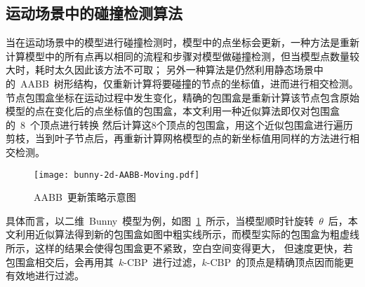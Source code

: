 \subsection{运动场景中的碰撞检测算法}
\label{subsec:moving:cd}

当在运动场景中的模型进行碰撞检测时，模型中的点坐标会更新，一种方法是重新计算模型中的所有点再以相同的流程和步骤对模型做碰撞检测，但当模型点数量较大时，耗时太久因此该方法不可取；
另外一种算法是仍然利用静态场景中的~AABB~树形结构，仅重新计算将要碰撞的节点的坐标值，进而进行相交检测。
节点包围盒坐标在运动过程中发生变化，精确的包围盒是重新计算该节点包含原始模型的点在变化后的点坐标值的包围盒，本文利用一种近似算法即仅对包围盒的~8~个顶点进行转换
然后计算这8个顶点的包围盒，用这个近似包围盒进行遍历剪枝，当到叶子节点后，再重新计算网格模型的点的新坐标值用同样的方法进行相交检测。

\begin{figure}[htb]
  \centering
  \texttt{[image: bunny-2d-AABB-Moving.pdf]}
  \caption{AABB~更新策略示意图}
  \label{fig:bunny:moving}
\end{figure}

具体而言，以二维~Bunny~模型为例，如图~\ref{fig:bunny:moving}~所示，当模型顺时针旋转~$\theta$~后，本文利用近似算法得到新的包围盒如图中粗实线所示，而模型实际的包围盒为粗虚线所示，这样的结果会使得包围盒更不紧致，空白空间变得更大，
但速度更快，若包围盒相交后，会再用其~$k$-CBP~进行过滤，$k$-CBP~的顶点是精确顶点因而能更有效地进行过滤。

